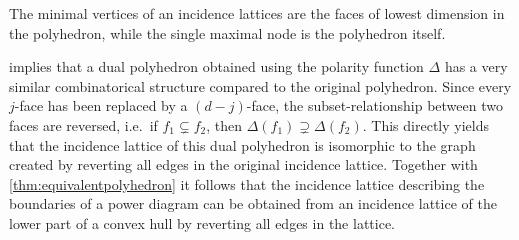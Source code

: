 The minimal vertices of an incidence lattices are the faces of lowest dimension in the polyhedron, while the single maximal node is the polyhedron itself.

 implies that a dual polyhedron obtained using the polarity function $\Delta$ has a very similar combinatorical structure compared to the original polyhedron.
Since every $j$-face has been replaced by a $(d-j)$-face, the subset-relationship between two faces are reversed, i.e.~if $f_1 \subsetneq f_2$, then $\Delta(f_1) \supsetneq \Delta(f_2)$.
This directly yields that the incidence lattice of this dual polyhedron is isomorphic to the graph created by reverting all edges in the original incidence lattice.
Together with \cref{thm:equivalentpolyhedron} it follows that the incidence lattice describing the boundaries of a power diagram can be obtained from an incidence lattice of the lower part of a convex hull by reverting all edges in the lattice.


